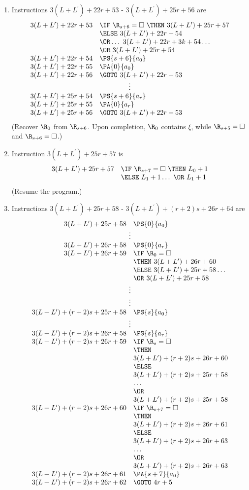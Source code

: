 \begin{enumerate}[1.]
\begin{enumerate}[(a)]
\begin{enumerate}[(1)]
\item Instructions $3(L + L^\prime) + 22r + 53$ - $3(L + L^\prime) + 25r + 56$ are
\[
\begin{array}{rl}
3(L + L^\prime) + 22r + 53 & \IF \ \R_{s + 6} = \Box \ \THEN \ 3(L + L^\prime) + 25r + 57 \cr
\ & \ELSE \ 3(L + L^\prime) + 22r + 54 \cr
\ & \OR \ldots \ 3(L + L^\prime) + 22r + 3k + 54 \ldots \cr
\ & \OR \ 3(L + L^\prime) + 25r + 54 \cr
3(L + L^\prime) + 22r + 54 & \PS{s + 6}{a_0} \cr
3(L + L^\prime) + 22r + 55 & \PA{0}{a_0} \cr
3(L + L^\prime) + 22r + 56 & \GOTO \ 3(L + L^\prime) + 22r + 53 \cr
\multicolumn{2}{c}{\vdots} \cr
3(L + L^\prime) + 25r + 54 & \PS{s + 6}{a_r} \cr
3(L + L^\prime) + 25r + 55 & \PA{0}{a_r} \cr
3(L + L^\prime) + 25r + 56 & \GOTO \ 3(L + L^\prime) + 22r + 53
\end{array}
\]
(Recover $\R_0$ from $\R_{s + 6}$. Upon completion, $\R_0$ contains $\xi$, while $\R_{s + 5} = \Box$ and $\R_{s + 6} = \Box$.)
\item Instruction $3(L + L^\prime) + 25r + 57$ is
\[
\begin{array}{rl}
3(L + L^\prime) + 25r + 57 & \IF \ \R_{s + 7} = \Box \ \THEN \ L_0 + 1 \cr
\ & \ELSE \ L_1 + 1 \ldots \ \OR \ L_1 + 1 \cr
\end{array}
\]
(Resume the program.)
\item Instructions $3(L + L^\prime) + 25r + 58$ - $3(L + L^\prime) + (r + 2)s + 26r + 64$ are
\[
\begin{array}{rl}
3(L + L^\prime) + 25r + 58 & \PS{0}{a_0} \cr
\multicolumn{2}{c}{\vdots} \cr
3(L + L^\prime) + 26r + 58 & \PS{0}{a_r} \cr
3(L + L^\prime) + 26r + 59 & \IF \ \R_0 = \Box \cr
\ & \THEN \ 3(L + L^\prime) + 26r + 60 \cr
\ & \ELSE \ 3(L + L^\prime) + 25r + 58 \ldots \cr
\ & \OR \ 3(L + L^\prime) + 25r + 58 \cr
\multicolumn{2}{c}{\vdots} \cr
\multicolumn{2}{c}{\vdots} \cr
3(L + L^\prime) + (r + 2)s + 25r + 58 & \PS{s}{a_0} \cr
\multicolumn{2}{c}{\vdots} \cr
3(L + L^\prime) + (r + 2)s + 26r + 58 & \PS{s}{a_r} \cr
3(L + L^\prime) + (r + 2)s + 26r + 59 & \IF \ \R_s = \Box \cr
\ & \THEN \cr
\ & 3(L + L^\prime) + (r + 2)s + 26r + 60 \cr
\ & \ELSE \cr
\ & 3(L + L^\prime) + (r + 2)s + 25r + 58 \cr
\ & \ldots \cr
\ & \OR \cr
\ & 3(L + L^\prime) + (r + 2)s + 25r + 58 \cr
3(L + L^\prime) + (r + 2)s + 26r + 60 & \IF \ \R_{s + 7} = \Box \cr
\ & \THEN \cr
\ & 3(L + L^\prime) + (r + 2)s + 26r + 61 \cr
\ & \ELSE \cr
\ & 3(L + L^\prime) + (r + 2)s + 26r + 63 \cr
\ & \ldots \cr
\ & \OR \cr
\ & 3(L + L^\prime) + (r + 2)s + 26r + 63 \cr
3(L + L^\prime) + (r + 2)s + 26r + 61 & \PA{s + 7}{a_0} \cr
3(L + L^\prime) + (r + 2)s + 26r + 62 & \GOTO \ 4r + 5 \cr

\end{array}\]
\end{enumerate}
\end{enumerate}
\end{enumerate}
